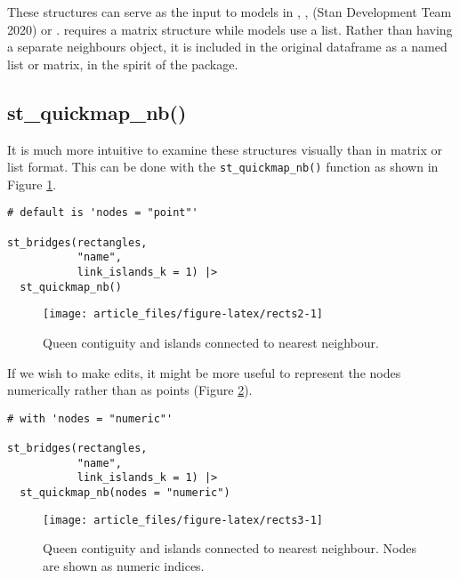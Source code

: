 These structures can serve as the input to models in ,
,  (Stan Development Team 2020) or .  requires a matrix structure while  models use a list. Rather than having a separate neighbours
object, it is included in the original  dataframe as a named list or matrix, in the spirit of the  package.

\hypertarget{st_quickmap_nb}{%
\subsection{st\_quickmap\_nb()}\label{st_quickmap_nb}}

It is much more intuitive to examine these structures visually than in
matrix or list format. This can be done with the \texttt{st\_quickmap\_nb()}
function as shown in Figure \ref{fig:rects2}.

\begin{verbatim}
# default is 'nodes = "point"'

st_bridges(rectangles, 
           "name", 
           link_islands_k = 1) |> 
  st_quickmap_nb()
\end{verbatim}

\begin{figure}

{\centering \texttt{[image: article\_files/figure-latex/rects2-1]} 

}

\caption{Queen contiguity and islands connected to nearest neighbour. }\label{fig:rects2}
\end{figure}

If we wish to make edits, it might be more useful to represent the nodes
numerically rather than as points (Figure \ref{fig:rects3}).

\begin{verbatim}
# with 'nodes = "numeric"'

st_bridges(rectangles, 
           "name", 
           link_islands_k = 1) |> 
  st_quickmap_nb(nodes = "numeric")
\end{verbatim}

\begin{figure}

{\centering \texttt{[image: article\_files/figure-latex/rects3-1]} 

}

\caption{Queen contiguity and islands connected to nearest neighbour. Nodes are shown as numeric indices. }\label{fig:rects3}
\end{figure}

